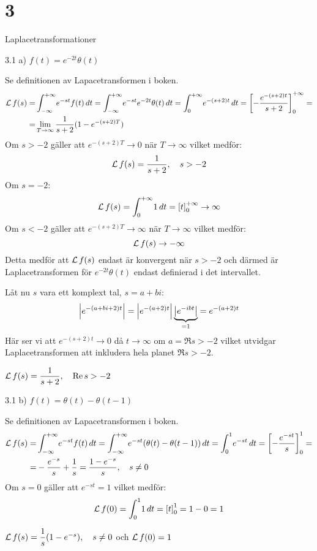 \chapter{3}{Laplacetransformationer}

\begin{task}{3.1 a)}
	$f(t)=e^{-2t}\theta(t)$
	
	Se definitionen av Lapacetransformen i boken.
	\begin{align*}
	\operatorname{\mathcal{L}} f(s)=
	&\int_{-\infty}^{+\infty}\! e^{-st}f(t) \, dt=
	\int_{-\infty}^{+\infty}\! e^{-st}e^{-2t}\theta(t) \, dt=
	\int_{0}^{+\infty}\! e^{-(s+2)t} \, dt=
	\left[-\frac{e^{-(s+2)t}}{s+2}\right]_0^{+\infty}= \\ =
	&\lim\limits_{T\rightarrow\infty}\frac{1}{s+2}(1-e^{-(s+2)T})
	\end{align*}
	Om $s>-2$ gäller att $e^{-(s+2)T} \rightarrow 0$ när $T \rightarrow \infty$ vilket medför:
	\[\operatorname{\mathcal{L}} f(s)=\frac{1}{s+2}, \quad s>-2\]
	Om $s=-2$:
	\[\operatorname{\mathcal{L}} f(s)=
	\int_{0}^{+\infty}\! 1 \, dt=
	\left[t\right]_0^{+\infty}\rightarrow\infty\]
	Om $s<-2$ gäller att $e^{-(s+2)T} \rightarrow \infty$ när $T \rightarrow \infty$ vilket medför:
	\[\operatorname{\mathcal{L}} f(s)\rightarrow-\infty\]
	Detta medför att $\operatorname{\mathcal{L}} f(s)$ endast är konvergent när $s>-2$ och därmed är Laplacetransformen för $e^{-2t}\theta(t)$ endast definierad i det intervallet.
	
	Låt nu $s$ vara ett komplext tal, $s=a+bi$:
	\[\left|e^{-(a+bi+2)t}\right|=
	\left|e^{-(a+2)t}\right|\underbrace{\left|e^{-ibt}\right|}_{=1}=
	e^{-(a+2)t}\]
	Här ser vi att $e^{-(s+2)t}\rightarrow 0$ då $t\rightarrow \infty$ om $a = \Re s > -2$ vilket utvidgar Laplacetransformen att inkludera hela planet $\Re s > -2$.
	
	\ans $\operatorname{\mathcal{L}} f(s)= \dfrac{1}{s+2}, \quad \operatorname{Re} s > -2$
\end{task}

\begin{task}{3.1 b)}
	$f(t)=\theta(t)-\theta(t-1)$
	
	Se definitionen av Lapacetransformen i boken.
	\begin{align*}
	\operatorname{\mathcal{L}} f(s)=
	&\int_{-\infty}^{+\infty}\! e^{-st}f(t) \, dt=
	\int_{-\infty}^{+\infty}\! e^{-st}(\theta(t)-\theta(t-1)) \, dt=
	\int_{0}^{1}\! e^{-st} \, dt=
	\left[-\frac{e^{-st}}{s}\right]_0^{1}= \\ =
	&-\frac{e^{-s}}{s}+\frac{1}{s}=
	\frac{1-e^{-s}}{s}, \quad s\neq0
	\end{align*}
	Om $s=0$ gäller att $e^{-st} = 1$ vilket medför:
	\[\operatorname{\mathcal{L}} f(0)=
	\int_{0}^{1}\! 1 \, dt=
	\left[t\right]_0^1=
	1-0=1\]
	
	\ans $\operatorname{\mathcal{L}} f(s)= \dfrac{1}{s}(1-e^{-s}), \quad s\neq0$ och $\operatorname{\mathcal{L}} f(0)= 1$
\end{task}

